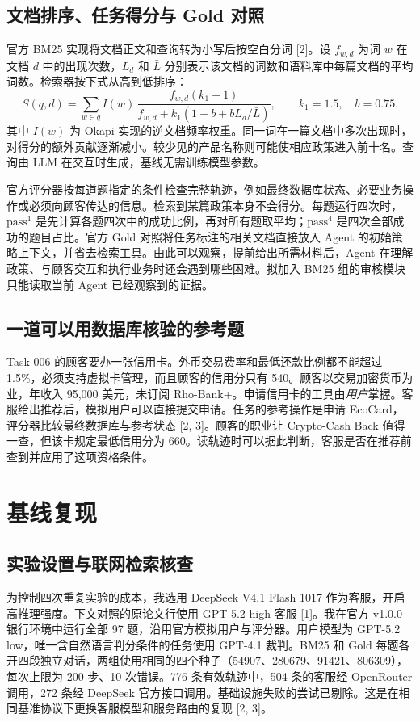 \documentclass{article}
\begin{document}
\subsection{文档排序、任务得分与 Gold 对照}
官方 BM25 实现将文档正文和查询转为小写后按空白分词 [2]。设 $f_{w,d}$ 为词 $w$ 在文档 $d$ 中的出现次数，$L_d$ 和 $\bar L$ 分别表示该文档的词数和语料库中每篇文档的平均词数。检索器按下式从高到低排序：
\[
 S(q,d)=\sum_{w\in q} I(w)\,
 \frac{f_{w,d}(k_1+1)}
 {f_{w,d}+k_1(1-b+bL_d/\bar L)},\qquad k_1=1.5,\quad b=0.75 .
\]
其中 $I(w)$ 为 Okapi 实现的逆文档频率权重。同一词在一篇文档中多次出现时，对得分的额外贡献逐渐减小。较少见的产品名称则可能使相应政策进入前十名。查询由 LLM 在交互时生成，基线无需训练模型参数。

官方评分器按每道题指定的条件检查完整轨迹，例如最终数据库状态、必要业务操作或必须向顾客传达的信息。检索到某篇政策本身不会得分。每题运行四次时，$\mathrm{pass}^{1}$ 是先计算各题四次中的成功比例，再对所有题取平均；$\mathrm{pass}^{4}$ 是四次全部成功的题目占比。官方 Gold 对照将任务标注的相关文档直接放入 Agent 的初始策略上下文，并省去检索工具。由此可以观察，提前给出所需材料后，Agent 在理解政策、与顾客交互和执行业务时还会遇到哪些困难。拟加入 BM25 组的审核模块只能读取当前 Agent 已经观察到的证据。
\subsection{一道可以用数据库核验的参考题}
Task 006 的顾客要办一张信用卡。外币交易费率和最低还款比例都不能超过 1.5\%，必须支持虚拟卡管理，而且顾客的信用分只有 540。顾客以交易加密货币为业，年收入 95,000 美元，未订阅 Rho-Bank+。申请信用卡的工具由\emph{用户}掌握。客服给出推荐后，模拟用户可以直接提交申请。任务的参考操作是申请 EcoCard，评分器比较最终数据库与参考状态 [2, 3]。顾客的职业让 Crypto-Cash Back 值得一查，但该卡规定最低信用分为 660。读轨迹时可以据此判断，客服是否在推荐前查到并应用了这项资格条件。

\section{基线复现}
\subsection{实验设置与联网检索核查}
为控制四次重复实验的成本，我选用 DeepSeek V4.1 Flash 1017 作为客服，开启高推理强度。下文对照的原论文行使用 GPT-5.2 high 客服 [1]。我在官方 v1.0.0 银行环境中运行全部 97 题，沿用官方模拟用户与评分器。用户模型为 GPT-5.2 low，唯一含自然语言判分条件的任务使用 GPT-4.1 裁判。BM25 和 Gold 每题各开四段独立对话，两组使用相同的四个种子（54907、280679、91421、806309），每次上限为 200 步、10 次错误。776 条有效轨迹中，504 条的客服经 OpenRouter 调用，272 条经 DeepSeek 官方接口调用。基础设施失败的尝试已剔除。这是在相同基准协议下更换客服模型和服务路由的复现 [2, 3]。
\end{document}
